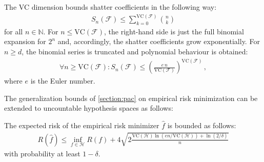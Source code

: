     \begin{property}\label{data:sauer_lemma}
        The VC dimension bounds shatter coefficients in the following way:
        \begin{gather}
            S_n(\mathcal{F})\leq\sum_{k=0}^{\mathrm{VC}(\mathcal{F})}\binom{n}{k}
        \end{gather}
        for all $n\in\mathbb{N}$. For $n\leq\mathrm{VC}(\mathcal{F})$, the right-hand side is just the full binomial expansion for $2^n$ and, accordingly, the shatter coefficients grow exponentially. For $n\geq d$, the binomial series is truncated and polynomial behaviour is obtained:
        \begin{gather}
            \forall n\geq\mathrm{VC}(\mathcal{F}):S_n(\mathcal{F})\leq\left(\frac{e\,n}{\mathrm{VC}(\mathcal{F})}\right)^{\mathrm{VC}(\mathcal{F})}\,,
        \end{gather}
        where $e$ is the Euler number.
    \end{property}

    The generalization bounds of \cref{section:pac} on empirical risk minimization can be extended to uncountable hypothesis spaces as follows:
    \begin{property}
        The expected risk of the empirical risk minimizer $\hat{f}$ is bounded as follows:
        \begin{gather}
            R(\hat{f})\leq\inf_{f\in\mathcal{H}}R(f)+4\sqrt{2\frac{\mathrm{VC}(\mathcal{H})\ln(en/\mathrm{VC}(\mathcal{H})) + \ln(2/\delta)}{n}}
        \end{gather}
        with probability at least $1-\delta$.
    \end{property}

